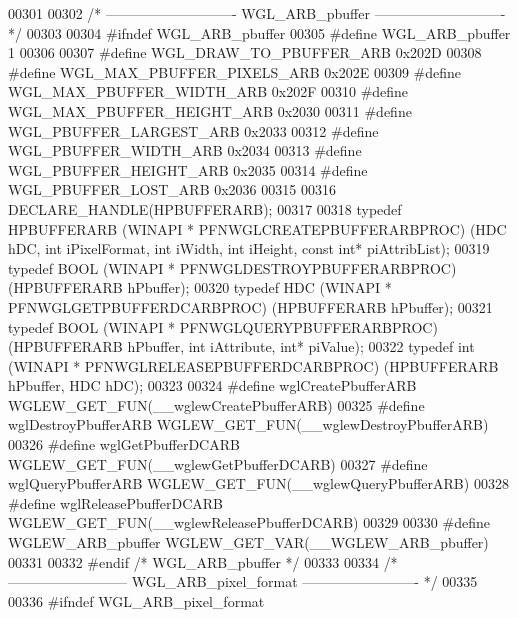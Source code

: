 \begin{DoxyCode}
00301 
00302 \textcolor{comment}{/* ---------------------------- WGL\_ARB\_pbuffer ---------------------------- */}
00303 
00304 \textcolor{preprocessor}{#ifndef WGL\_ARB\_pbuffer}
00305 \textcolor{preprocessor}{#define WGL\_ARB\_pbuffer 1}
00306 
00307 \textcolor{preprocessor}{#define WGL\_DRAW\_TO\_PBUFFER\_ARB 0x202D}
00308 \textcolor{preprocessor}{#define WGL\_MAX\_PBUFFER\_PIXELS\_ARB 0x202E}
00309 \textcolor{preprocessor}{#define WGL\_MAX\_PBUFFER\_WIDTH\_ARB 0x202F}
00310 \textcolor{preprocessor}{#define WGL\_MAX\_PBUFFER\_HEIGHT\_ARB 0x2030}
00311 \textcolor{preprocessor}{#define WGL\_PBUFFER\_LARGEST\_ARB 0x2033}
00312 \textcolor{preprocessor}{#define WGL\_PBUFFER\_WIDTH\_ARB 0x2034}
00313 \textcolor{preprocessor}{#define WGL\_PBUFFER\_HEIGHT\_ARB 0x2035}
00314 \textcolor{preprocessor}{#define WGL\_PBUFFER\_LOST\_ARB 0x2036}
00315 
00316 DECLARE_HANDLE(HPBUFFERARB);
00317 
00318 \textcolor{keyword}{typedef} HPBUFFERARB (WINAPI * PFNWGLCREATEPBUFFERARBPROC) (HDC hDC, \textcolor{keywordtype}{int} 
      iPixelFormat, \textcolor{keywordtype}{int} iWidth, \textcolor{keywordtype}{int} iHeight, \textcolor{keyword}{const} \textcolor{keywordtype}{int}* piAttribList);
00319 \textcolor{keyword}{typedef} BOOL (WINAPI * PFNWGLDESTROYPBUFFERARBPROC) (HPBUFFERARB hPbuffer);
00320 \textcolor{keyword}{typedef} HDC (WINAPI * PFNWGLGETPBUFFERDCARBPROC) (HPBUFFERARB hPbuffer);
00321 \textcolor{keyword}{typedef} BOOL (WINAPI * PFNWGLQUERYPBUFFERARBPROC) (HPBUFFERARB hPbuffer, \textcolor{keywordtype}{int} 
      iAttribute, \textcolor{keywordtype}{int}* piValue);
00322 \textcolor{keyword}{typedef} int (WINAPI * PFNWGLRELEASEPBUFFERDCARBPROC) (HPBUFFERARB hPbuffer, HDC 
      hDC);
00323 
00324 \textcolor{preprocessor}{#define wglCreatePbufferARB WGLEW\_GET\_FUN(\_\_wglewCreatePbufferARB)}
00325 \textcolor{preprocessor}{#define wglDestroyPbufferARB WGLEW\_GET\_FUN(\_\_wglewDestroyPbufferARB)}
00326 \textcolor{preprocessor}{#define wglGetPbufferDCARB WGLEW\_GET\_FUN(\_\_wglewGetPbufferDCARB)}
00327 \textcolor{preprocessor}{#define wglQueryPbufferARB WGLEW\_GET\_FUN(\_\_wglewQueryPbufferARB)}
00328 \textcolor{preprocessor}{#define wglReleasePbufferDCARB WGLEW\_GET\_FUN(\_\_wglewReleasePbufferDCARB)}
00329 
00330 \textcolor{preprocessor}{#define WGLEW\_ARB\_pbuffer WGLEW\_GET\_VAR(\_\_WGLEW\_ARB\_pbuffer)}
00331 
00332 \textcolor{preprocessor}{#endif }\textcolor{comment}{/* WGL\_ARB\_pbuffer */}\textcolor{preprocessor}{}
00333 
00334 \textcolor{comment}{/* -------------------------- WGL\_ARB\_pixel\_format ------------------------- */}
00335 
00336 \textcolor{preprocessor}{#ifndef WGL\_ARB\_pixel\_format}

\end{DoxyCode}

